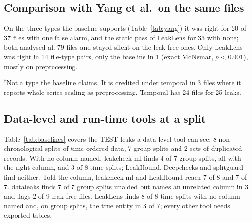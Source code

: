 \documentclass[10pt,a4paper,twocolumn]{article}
\newcommand{\tool}{LeakLens}
\begin{document}
\subsection{Comparison with Yang et al.\ on the same files}

On the three types the baseline supports (Table~\ref{tab:yang}) it was right for 20 of 37 files with one false
alarm, and the static pass of \tool{} for 33 with none; both analysed all 79 files and stayed silent on the
leak-free ones. Only \tool{} was right in 14 file-type pairs, only the baseline in 1 (exact McNemar,
$p<0.001$), mostly on preprocessing.

\begin{table}[t]
\caption{Yang et al.\ and \tool{} (static) on the 79 injected TEST files, scored per file and type. Found: files
with the leak in which the tool reports the type. False: files where it reports the type wrongly.}
\label{tab:yang}
\footnotesize
\setlength{\tabcolsep}{4.5pt}


\vspace{2pt}
\raggedright $^{\dagger}$Not a type the baseline claims. It is credited under temporal in 3 files where it reports
whole-series scaling as preprocessing. Temporal has 24 files for 25 leaks.
\end{table}

\subsection{Data-level and run-time tools at a split}

Table~\ref{tab:baselines} covers the TEST leaks a data-level tool can see: 8 non-chronological splits of
time-ordered data, 7 group splits and 2 sets of duplicated records. With no column named, leakcheck-ml finds 4 of
7 group splits, all with the right column, and 3 of 8 time splits; LeakHound, Deepchecks and splitguard find
neither. Told the column, leakcheck-ml and LeakHound reach 7 of 8 and 7 of 7. dataleaks finds 7 of 7 group splits
unaided but names an unrelated column in 3 and flags 2 of 9 leak-free files. \tool{} finds 8 of 8 time splits with
no column named and, on group splits, the true entity in 3 of 7; every other tool needs exported tables.

\begin{table}[t]
\caption{Leaks at a split call, injected TEST. Col.: true column named to the tool. T1: non-chronological
splits; Grp: group splits (line rule), col.: naming the true entity; Dup.: duplicated records; Clean: leak-free
files flagged.}
\label{tab:baselines}
\footnotesize
\setlength{\tabcolsep}{2.6pt}

\end{table}
\end{document}
